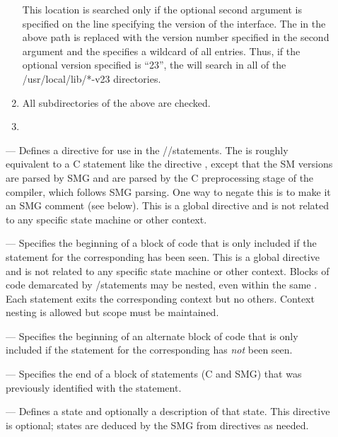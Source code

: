 \begin{description}
\begin{enumerate}
    This location is searched only if the optional second argument is
    specified on the \SMINCL line specifying the version of the
    interface.  The  in the above path is replaced with the
    version number specified in the second argument and the \file{*}
    specifies a wildcard of all entries.  Thus, if the optional
    version specified is ``23'', the \SMINCL will search in all of the
    /usr/local/lib/*-v23 directories.
  \item {}
    
    All subdirectories of the above are checked.
  \item {}
  \end{enumerate}
  
\item[\hypertarget{SMDEF}{\SM{DEF}}] --- Defines a directive for use
  in the \SMIF/\SMELSE/\SMEND statements.  The  is roughly
  equivalent to a C statement like the directive , except that the SM versions are parsed by SMG and
   are parsed by the C preprocessing stage of the
  compiler, which follows SMG parsing.  One way to negate this is to
  make it an SMG comment (see below).  This is a global directive and
  is not related to any specific state machine or other context.
  
\item[\hypertarget{SMIF}{\SM{IF}}] --- Specifies the beginning of a
  block of code that is only included if the \SMDEF statement for the
  corresponding  has been seen.  This is a global
  directive and is not related to any specific state machine or other
  context.  Blocks of code demarcated by \SMIF/\SMEND statements may
  be nested, even within the same .  Each \SMEND
  statement exits the corresponding \SMIF context but no others.
  Context nesting is allowed but scope must be maintained.
  
\item[\hypertarget{SMELSE}{\SM{ELSE}}] --- Specifies the beginning of
  an alternate block of code that is only included if the \SMDEF
  statement for the corresponding  has {\em not}
  been seen.

\item[\hypertarget{SMEND}{\SM{END}}] --- Specifies the end of a block
  of statements (C and SMG) that was previously identified with the
  \SMIF statement.
  
\item[\hypertarget{STATE}{\smg{STATE}}] --- Defines a state and
  optionally a description of that state.  This directive is optional;
  states are deduced by the SMG from \TRANS directives as needed.
  

\end{description}
